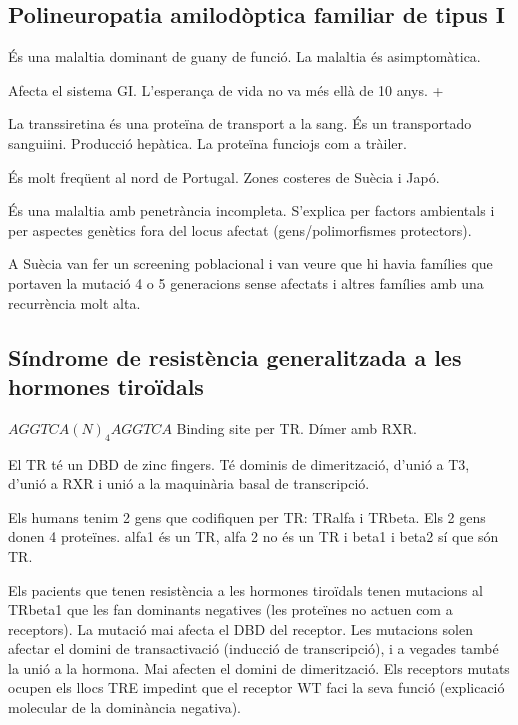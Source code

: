 \subsection{Polineuropatia amilodòptica familiar de tipus I}
És una malaltia dominant de guany de funció. La malaltia és asimptomàtica.

Afecta el sistema GI. L'esperança de vida no va més ellà de 10 anys. +

La transsiretina és una proteïna de transport a la sang. És un transportado sanguiini. Producció hepàtica. La proteïna funciojs com a tràiler. 

És molt freqüent al nord de Portugal. Zones costeres de Suècia i Japó.

És una malaltia amb penetrància incompleta. S'explica per factors ambientals i per aspectes genètics fora del locus afectat (gens/polimorfismes protectors).

A Suècia van fer un screening poblacional i van veure que hi havia famílies que portaven la mutació 4 o 5 generacions sense afectats i altres famílies amb una recurrència molt alta.



\subsection{Síndrome de resistència generalitzada a les hormones tiroïdals}


$AGGTCA(N)_4AGGTCA$ Binding site per TR. Dímer amb RXR.

El TR té un DBD de zinc fingers. Té dominis de dimerització, d'unió a T3, d'unió a RXR i unió a la maquinària basal de transcripció.

Els humans tenim 2 gens que codifiquen per TR: TRalfa i TRbeta. Els 2 gens donen 4 proteïnes. alfa1 és un TR, alfa 2 no és un TR i beta1 i beta2 sí que són TR.


Els pacients que tenen resistència a les hormones tiroïdals tenen mutacions al TRbeta1 que les fan dominants negatives (les proteïnes no actuen com a receptors). La mutació mai afecta el DBD del receptor. Les mutacions solen afectar el domini de transactivació (inducció de transcripció), i a vegades també la unió a la hormona. Mai afecten el domini de dimerització. Els receptors mutats ocupen els llocs TRE impedint que el receptor WT faci la seva funció (explicació molecular de la dominància negativa).

